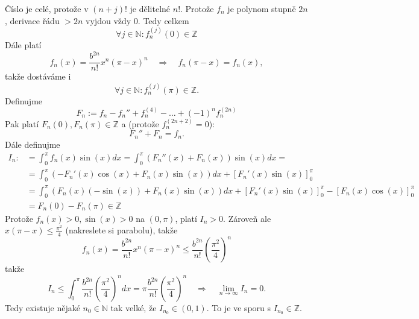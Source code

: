 \begin{důkaz}
\begin{equation*}
  \end{equation*}
  Číslo je celé, protože v $(n+j)!$ je dělitelné $n!$. Protože $f_n$ je polynom stupně $2n$, derivace řádu $>2n$ vyjdou vždy 0. Tedy celkem
  \begin{equation*}
    \forall j\in \mathbb{N}\colon f_n^{(j)}(0)\in \mathbb{Z} 
  \end{equation*}
  Dále platí
  \begin{equation*}
    f_n(x)=\frac{b^{2n}}{n!}x^{n}(\pi-x)^{n}\quad \Rightarrow \quad f_n(\pi-x)=f_n(x),
  \end{equation*}
  takže dostáváme i 
  \begin{equation*}
    \forall j\in \mathbb{N}\colon f_n^{(j)}(\pi)\in \mathbb{Z}.
  \end{equation*}
Definujme
\begin{equation*}
  F_n := f_n-f_n''+f_n^{(4)}-\hdots + (-1)^{n}f_n^{(2n)}
\end{equation*}
Pak platí $F_n(0), F_n(\pi)\in \mathbb{Z}$ a (protože $f_n^{(2n+2)}=0$):
\begin{equation*}
  F_n''+F_n = f_n.
\end{equation*}
Dále definujme
\begin{align*}
	I_n :&= \int_0^\pi f_n(x)\sin(x)dx = \int_0^\pi (F_n''(x)+F_n(x))\sin(x)dx =\\
	     &= \int_0^\pi (-F_n'(x)\cos(x)+F_n(x)\sin(x))dx + [F_n'(x)\sin(x)]_0^\pi \\
	     &= \int_0^\pi (F_n(x)(-\sin(x))+F_n(x)\sin(x))dx + [F_n'(x)\sin(x)]_0^\pi - [F_n(x)\cos(x)]_0^\pi \\
	     &= F_n(0)-F_n(\pi) \in \mathbb{Z}
\end{align*}
Protože $f_n(x)>0, \sin(x)>0$ na $(0,\pi)$, platí $I_n>0.$ Zároveň ale $x(\pi-x)\leq \frac{\pi^{2}}{4}$ (nakreslete si parabolu), takže
\begin{equation*}
  f_n(x)=\frac{b^{2n}}{n!}x^{n}(\pi-x)^{n}\leq \frac{b^{2n}}{n!}\left(\frac{\pi^{2}}{4}\right)^{n}
\end{equation*}
takže 
\begin{equation*}
	I_n \leq \int_0^\pi \frac{b^{2n}}{n!}\left(\frac{\pi^{2}}{4}\right)^{n} dx = \pi\frac{b^{2n}}{n!}\left(\frac{\pi^{2}}{4}\right)^{n}\quad \Rightarrow \quad \lim_{n\to \infty}I_n=0.
\end{equation*}
Tedy existuje nějaké $n_0\in \mathbb{N}$ tak velké, že $I_{n_0}\in(0,1).$ To je ve sporu s $I_{n_0}\in \mathbb{Z}.$
\end{důkaz}

